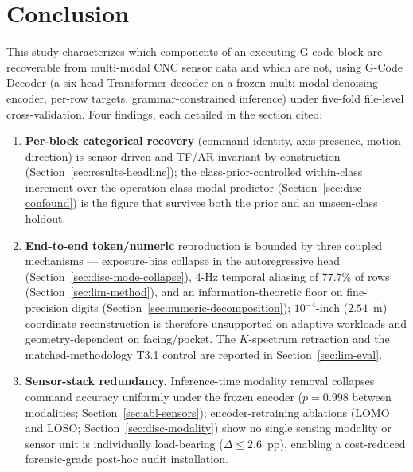 \documentclass[sensors,article,submit,moreauthors,pdftex]{Definitions/mdpi}
\newcommand{\modelname}{G-Code Decoder}
\begin{document}
\section{Conclusion}
\label{sec:conclusion}

This study characterizes which components of an executing G-code block are recoverable from multi-modal CNC sensor data and which are not, using \modelname{} (a six-head Transformer decoder on a frozen multi-modal denoising encoder, per-row targets, grammar-constrained inference) under five-fold file-level cross-validation. Four findings, each detailed in the section cited:

\begin{enumerate}[label=(\arabic*), leftmargin=*, nosep]
\item \textbf{Per-block categorical recovery} (command identity, axis presence, motion direction) is sensor-driven and TF/AR-invariant by construction (Section~\ref{sec:results-headline}); the class-prior-controlled within-class increment over the operation-class modal predictor (Section~\ref{sec:disc-confound}) is the figure that survives both the prior and an unseen-class holdout.
\item \textbf{End-to-end token/numeric} reproduction is bounded by three coupled mechanisms --- exposure-bias collapse in the autoregressive head (Section~\ref{sec:disc-mode-collapse}), 4-Hz temporal aliasing of $77.7\%$ of rows (Section~\ref{sec:lim-method}), and an information-theoretic floor on fine-precision digits (Section~\ref{sec:numeric-decomposition}); $10^{-4}$-inch ($2.54$~\textmu m) coordinate reconstruction is therefore unsupported on adaptive workloads and geometry-dependent on facing/pocket. The $K$-spectrum retraction and the matched-methodology T3.1 control are reported in Section~\ref{sec:lim-eval}.
\item \textbf{Sensor-stack redundancy.} Inference-time modality removal collapses command accuracy uniformly under the frozen encoder ($p\!=\!0.998$ between modalities; Section~\ref{sec:abl-sensors}); encoder-retraining ablations (LOMO and LOSO; Section~\ref{sec:disc-modality}) show no single sensing modality or sensor unit is individually load-bearing ($\Delta\!\le\!2.6$~pp), enabling a cost-reduced forensic-grade post-hoc audit installation.

\end{enumerate}
\end{document}
